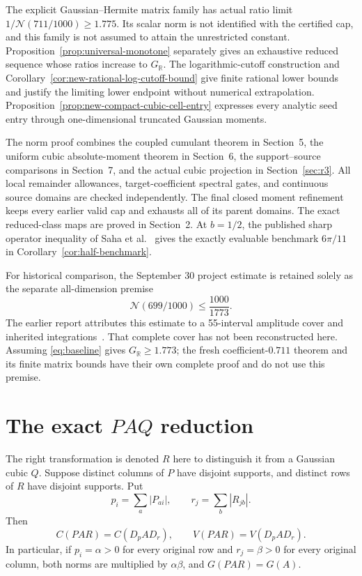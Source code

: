 \documentclass[11pt]{article}
\newcommand{\R}{\mathbb R}
\newcommand{\GR}{G_{\R}}
\newcommand{\N}{\mathcal N}
\begin{document}
The explicit Gaussian--Hermite matrix family has actual ratio limit
$1/\N(711/1000)\geq1.775$. Its scalar norm is not identified with the
certified cap, and this family is not assumed to attain the unrestricted
constant. Proposition~\ref{prop:universal-monotone} separately gives an
exhaustive reduced sequence whose ratios increase to $\GR$.
The logarithmic-cutoff construction and
Corollary~\ref{cor:new-rational-log-cutoff-bound} give finite rational
lower bounds and justify the limiting lower endpoint without numerical
extrapolation. Proposition~\ref{prop:new-compact-cubic-cell-entry}
expresses every analytic seed entry through one-dimensional truncated
Gaussian moments.

The norm proof combines the coupled cumulant theorem in Section~5,
the uniform cubic absolute-moment theorem in Section~6, the
support--source comparisons in Section~7, and the actual cubic projection
in Section~\ref{sec:r3}. All local remainder allowances, target-coefficient
spectral gates, and continuous source domains are checked independently.
The final closed moment refinement keeps every earlier valid cap and
exhausts all of its parent domains. The exact reduced-class maps are
proved in Section~2. At $b=1/2$, the published sharp operator inequality
of Saha et al.~\cite{saha} gives the exactly evaluable benchmark
$6\pi/11$ in Corollary~\ref{cor:half-benchmark}.

For historical comparison, the September 30 project estimate is retained
solely as the separate all-dimension premise
\begin{equation}\label{eq:baseline}
 \N(699/1000)\leq\frac{1000}{1773}.
\end{equation}
The earlier report attributes this estimate to a 55-interval amplitude
cover and inherited integrations~\cite{baseline}. That complete cover
has not been reconstructed here. Assuming \eqref{eq:baseline} gives
$\GR\geq1.773$; the fresh coefficient-$0.711$ theorem and its finite
matrix bounds have their own complete proof and do not use this premise.

\section{The exact $PAQ$ reduction}
The right transformation is denoted $R$ here to distinguish it from a
Gaussian cubic $Q$. Suppose distinct columns of $P$ have disjoint supports,
and distinct rows of $R$ have disjoint supports. Put
\[
 p_i=\sum_a|P_{ai}|,\qquad r_j=\sum_b|R_{jb}|.
\]
Then
\begin{equation}\label{eq:copies}
 C(PAR)=C(D_pAD_r),\qquad V(PAR)=V(D_pAD_r).
\end{equation}
In particular, if $p_i=\alpha>0$ for every original row and
$r_j=\beta>0$ for every original column, both norms are multiplied by
$\alpha\beta$, and $G(PAR)=G(A)$.
\end{document}
